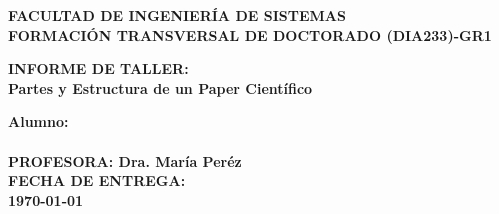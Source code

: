 \pagestyle{empty}
\begin{titlepage}
  \begin{center}
    \noindent \huge \textbf{FACULTAD DE INGENIERÍA DE SISTEMAS}\\ \vspace{2.cm}
    \noindent \huge \textbf{FORMACIÓN TRANSVERSAL DE DOCTORADO (DIA233)-GR1}\\ \vspace{2.cm}
    

  \end{center}

  \begin{center}
    \noindent \huge{\textbf{INFORME DE TALLER: \\Partes y Estructura de un Paper Científico}}

  \end{center}

  \vspace{0.5cm}

  \begin{center}
    \noindent \huge{\textbf{Alumno:}}\\
    \\
    \vspace{ 2.0cm}
    \noindent \huge{ \textbf{PROFESORA: Dra. María Peréz}}\\
    \vspace{2.cm}
    \noindent \huge{ \textbf{FECHA DE ENTREGA: \\ \vspace{0.5cm}\today}}
  \end{center}
  \newpage
  \cleardoublepage
\end{titlepage}
